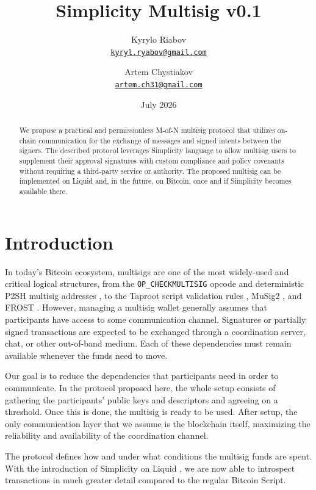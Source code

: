 \documentclass[11pt]{article}
\title{Simplicity Multisig v0.1}
\author{
    Kyrylo Riabov\\
    \href{mailto:kyryl.ryabov@gmail.com}{\texttt{kyryl.ryabov@gmail.com}}
    \and
    Artem Chystiakov\\
    \href{mailto:artem.ch31@gmail.com}{\texttt{artem.ch31@gmail.com}}
}
\date{July 2026}
\begin{document}
    \maketitle

    \begin{abstract}
        We propose a practical and permissionless M-of-N multisig protocol that utilizes on-chain communication for the exchange of messages and signed intents between the signers. The described protocol leverages Simplicity language to allow multisig users to supplement their approval signatures with custom compliance and policy covenants without requiring a third-party service or authority. The proposed multisig can be implemented on Liquid and, in the future, on Bitcoin, once and if Simplicity becomes available there.
    \end{abstract}


    \section{Introduction}

    In today's Bitcoin ecosystem, multisigs are one of the most widely-used and critical logical structures, from the
    \texttt{OP\_CHECKMULTISIG} opcode \cite{bip11} and deterministic P2SH multisig addresses \cite{bip67}, to the Taproot script validation rules \cite{bip341,bip342}, MuSig2 \cite{musig2}, and FROST \cite{frost}. However, managing a multisig wallet generally assumes that participants have access to some communication channel. Signatures or partially signed transactions are expected to be exchanged through a coordination server, chat, or other out-of-band medium. Each of these dependencies must remain available whenever the funds need to move.

    Our goal is to reduce the dependencies that participants need in order to communicate. In the protocol proposed here, the whole setup consists of gathering the participants' public keys and descriptors and agreeing on a threshold. Once this is done, the multisig is ready to be used. After setup, the only communication layer that we assume is the blockchain itself, maximizing the reliability and availability of the coordination channel.

    The protocol defines how and under what conditions the multisig funds are spent. With the introduction of Simplicity on Liquid \cite{simplicity,liquid}, we are now able to introspect transactions in much greater detail compared to the regular Bitcoin Script.
\end{document}
